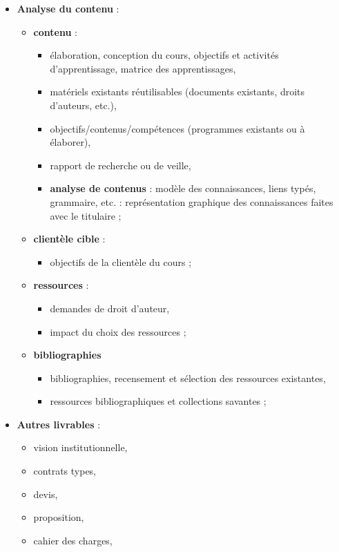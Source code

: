 \begin{frame}[allowframebreaks]
\begin{itemize}
							\item \textbf{Analyse du contenu} : 
								\begin{itemize}
								\item \textbf{contenu }: 
									\begin{itemize}
									\item élaboration, conception du cours, objectifs et activités d’apprentissage, matrice des apprentissages,
									\item matériels existants réutilisables (documents existants, droits d’auteurs, etc.),
									\item objectifs/contenus/compétences (programmes existants ou à élaborer),
									\item rapport de recherche ou de veille, 
									\item \textbf{analyse de contenus }: modèle des connaissances, liens typés, grammaire, etc. : représentation graphique des connaissances faites avec le titulaire ;
									\end{itemize}
								\item \textbf{clientèle cible} :
									\begin{itemize}
									\item objectifs de la clientèle du cours ;
									\end{itemize}
								\item \textbf{ressources} : 
									\begin{itemize}
									\item demandes de droit d’auteur, 
									\item impact du choix des ressources ;
									\end{itemize}
								\item \textbf{bibliographies}
									\begin{itemize}
									\item bibliographies, recensement et sélection des ressources existantes,
									\item ressources bibliographiques et collections savantes ;
									\end{itemize}
								\end{itemize}
							\item \textbf{Autres livrables} : 
								\begin{itemize}
								\item vision institutionnelle,
								\item contrats types,
								\item devis,
								\item proposition,
								\item cahier des charges, 
								\end{itemize}
							\framebreak
							\end{itemize}	
												
					\end{frame}

